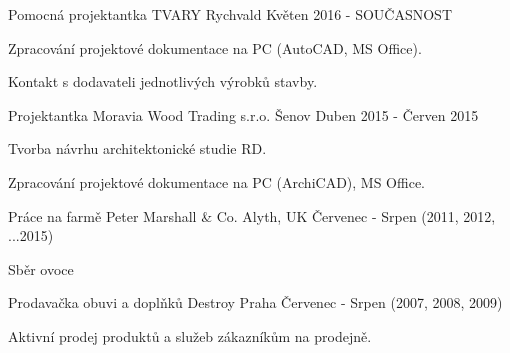 

\begin{cventries}

    \cventry
    {Pomocná projektantka} %
    {TVARY} %
    {Rychvald} %
    {Květen 2016 - SOUČASNOST} %
    {
      \begin{cvitems} %
        \item {Zpracování projektové dokumentace na PC (AutoCAD, MS Office).}
        \item {Kontakt s dodavateli jednotlivých výrobků stavby.}
      \end{cvitems}
    }
    \cventry
    {Projektantka} %
    {Moravia Wood Trading s.r.o.} %
    {Šenov} %
    {Duben 2015 - Červen 2015} %
    {
      \begin{cvitems} %
        \item {Tvorba návrhu architektonické studie RD.}
        \item {Zpracování projektové dokumentace na PC (ArchiCAD), MS Office.}
      \end{cvitems}
    }
    \cventry
    {Práce na farmě}
    {Peter Marshall \& Co.}
    {Alyth, UK}
    {Červenec - Srpen (2011, 2012, ...2015)}
    {
    \begin{cvitems}
      \item {Sběr ovoce}
    \end{cvitems}
    }
    \cventry
    {Prodavačka obuvi a doplňků}
    {Destroy}
    {Praha}
    {Červenec - Srpen (2007, 2008, 2009)}
    {
    \begin{cvitems}
      \item {Aktivní prodej produktů a služeb zákazníkům na prodejně.}
    \end{cvitems}
    }
  

\end{cventries}
